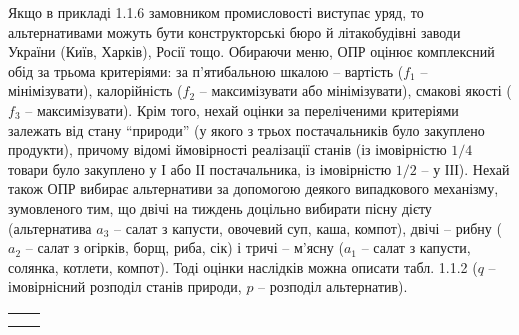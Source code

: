 \begin{enumerate}
    Якщо в прикладі 1.1.6 замовником промисловості виступає уряд, то альтернативами можуть бути конструкторські бюро й літакобудівні заводи України (Київ, Харків), Росії тощо. Обираючи меню, ОПР оцінює комплексний обід за трьома критеріями: за п'ятибальною шкалою -- вартість ($f_1$ -- мінімізувати), калорійність ($f_2$ -- максимізувати або мінімізувати), смакові якості ($f_3$ -- максимізувати). Крім того, нехай оцінки за переліченими критеріями залежать від стану ``природи'' (у якого з трьох постачальників було закуплено продукти), причому відомі ймовірності реалізації станів (із імовірністю $1/4$ товари було закуплено у $І$ або $ІІ$ постачальника, із імовірністю $1/2$ -- у $ІІІ$). Нехай також ОПР вибирає альтернативи за допомогою деякого випадкового механізму, зумовленого тим, що двічі на тиждень доцільно вибирати пісну дієту (альтернатива $a_3$ -- салат з капусти, овочевий суп, каша, компот), двічі -- рибну ($a_2$ -- салат з огірків, борщ, риба, сік) і тричі -- м'ясну ($a_1$ -- салат з капусти, солянка, котлети, компот). Тоді оцінки наслідків можна описати табл. 1.1.2 ($q$ -- імовірнісний розподіл станів природи, $p$ -- розподіл альтернатив).
    
    \begin{table}[H]
        \centering
        \begin{tabular}{c|c}
             &  \\
             & 
        \end{tabular}
    \end{table}
\end{enumerate}